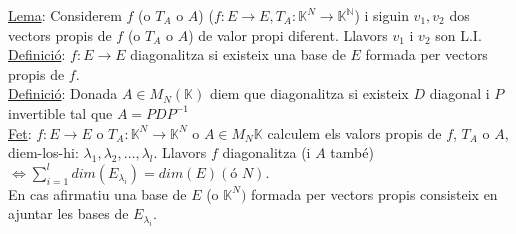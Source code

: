 \underline{Lema}: Considerem $f$ (o $T_A$ o $A$) ($f: E \rightarrow E, T_A: \mathbb{K}^N \rightarrow \mathbb{K^N}$) i siguin $v_1, v_2$ dos vectors propis de $f$ (o $T_A$ o $A$) de valor propi diferent. Llavors $v_1$ i $v_2$ son L.I.\\
\underline{Definició}: $f: E \rightarrow E$ diagonalitza si existeix una base de $E$ formada per vectors propis de $f$.\\
\underline{Definició}: Donada $A \in M_N(\mathbb{K})$ diem que diagonalitza si existeix $D$ diagonal i $P$ invertible tal que $A = PDP^{-1}$\\
\underline{Fet}: $f: E \rightarrow E$ o $T_A: \mathbb{K}^N \rightarrow \mathbb{K}^N$ o $A\in M_N{\mathbb{K}}$ calculem els valors propis de $f$, $T_A$ o $A$, diem-los-hi: $\lambda_1, \lambda_2, \dots, \lambda_l$. Llavors $f$ diagonalitza (i $A$ també) $\Longleftrightarrow \sum\limits_{i=1}^l dim(E_{\lambda_i}) = dim(E) (\text{ó } N)$.\\
En cas afirmatiu una base de $E$ (o $\mathbb{K}^N)$ formada per vectors propis consisteix en ajuntar les bases de $E_{\lambda_i}$.\\
